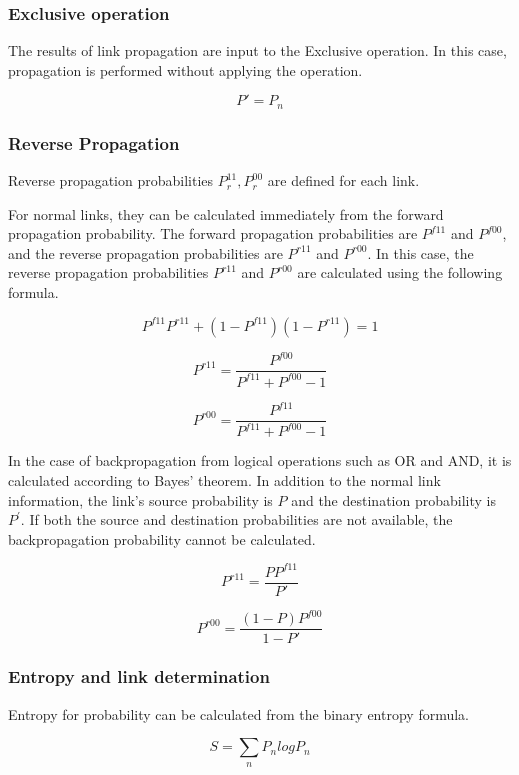 \documentclass[12pt]{article}
\begin{document}
\subsubsection{Exclusive operation}\label{exclusive-operation}

The results of link propagation are input to the Exclusive operation. In
this case, propagation is performed without applying the operation.

\[ P'=P_n \]

\subsubsection{Reverse Propagation}\label{reverse-propagation}

Reverse propagation probabilities \(P_{r}^{11},P_{r}^{00}\) are defined
for each link.

For normal links, they can be calculated immediately from the forward
propagation probability. The forward propagation probabilities are
\(P^{f11}\) and \(P^{f00}\), and the reverse propagation probabilities
are \(P^{r11}\) and \(P^{r00}\). In this case, the reverse propagation
probabilities \(P^{r11}\) and \(P^{r00}\) are calculated using the
following formula.

\[ P^{f11}P^{r11}+(1-P^{f11})(1-P^{r11})=1\]

\[ P^{r11}=\frac{P^{f00}}{P^{f11}+P^{f00}-1} \]

\[ P^{r00}=\frac{P^{f11}}{P^{f11}+P^{f00}-1} \]

In the case of backpropagation from logical operations such as OR and
AND, it is calculated according to Bayes' theorem. In addition to the
normal link information, the link's source probability is \(P\) and the
destination probability is \(P^{'}\). If both the source and destination
probabilities are not available, the backpropagation probability cannot
be calculated.

\[ P^{r11}=\frac{P P^{f11}}{P'}\]

\[ P^{r00}=\frac{(1-P) P^{f00}}{1-P'}\]

\subsubsection{Entropy and link determination}\label{entropy-and-link-determination}

Entropy for probability can be calculated from the binary entropy
formula.

\[ S =\sum_n P_nlogP_n \]
\end{document}
